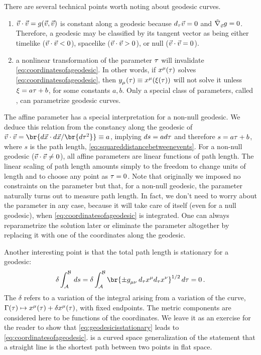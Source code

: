  There are several technical points worth noting about geodesic curves. 
%
\begin{enumerate}
  \item $\vec v\iprod\vec v = \metric\vat{\vec v,\vec v}$ is constant along a geodesic because $d_\tau\vec v = 0$ and $\cgradcov{\vec v}\metric = 0$. Therefore, a geodesic may be classified by its tangent vector as being either timelike ($\vec v\cdot\vec v < 0$), spacelike ($\vec v\cdot\vec v > 0$), or null ($\vec v\cdot\vec v = 0$). 
  \item a nonlinear transformation of the parameter $\tau$ will invalidate \cref{eq:coordinatesofageodesic}. In other words, if $\tvec\pos\mu\vat\ptime$ solves \cref{eq:coordinatesofageodesic}, then $\tcov y\mu\vat\ptime\defas\tvec\pos\mu\vat{\xi\vat\ptime}$ will not solve it unless $\xi = a\tau + b$, for some constants $a,b$. Only a special class of parameters, called , can parametrize geodesic curves.
\end{enumerate}
%
 The affine parameter has a special interpretation for a non-null geodesic. We deduce this relation from the constancy along the geodesic of $\vec v\iprod\vec v = \br{d\vec\pos\iprod d\vec\pos/\br{d\ptime^2}}\defas a$, implying $ds = ad\tau$ and therefore $s = a\tau + b$, where $s$ is the path length, \cref{eq:squareddistancebetweenevents}. For a non-null geodesic ($\vec v\cdot\vec v\neq 0$), all affine parameters are linear functions of path length. The linear scaling of path length amounts simply to the freedom to change units of length and to choose any point as $\tau = 0$. Note that originally we imposed no constraints on the parameter but that, for a non-null geodesic, the parameter naturally turns out to measure path length. In fact, we don't need to worry about the parameter in any case, because it will take care of itself (even for a null geodesic), when \cref{eq:coordinatesofageodesic} is integrated. One can always reparametrize the solution later or eliminate the parameter altogether by replacing it with one of the coordinates along the geodesic.

 Another interesting point is that the total path length is stationary for a geodesic:
%
\begin{equation}\label{eq:geodesicisstationary}
  \delta\int_{\point A}^{\point B}\,ds 
    = \delta\int_{\point A}^{\point B}
        \br{\pm\tmetric\mu\nu\,d_\ptime\tvec\pos\mu d_\ptime\tvec\pos\nu}^{1/2}\,d\ptime = 0\,.
\end{equation}
%
The $\delta$ refers to a variation of the integral arising from a variation of the curve, $\curve\vat\ptime\mapsto\tvec\pos\mu\vat\ptime + \delta\tvec\pos\mu\vat\ptime$, with fixed endpoints. The metric components are considered here to be functions of the coordinates. We leave it as an exercise for the reader to show that \cref{eq:geodesicisstationary} leads to \cref{eq:coordinatesofageodesic}.  is a curved space generalization of the statement that a straight line is the shortest path between two points in flat space.


